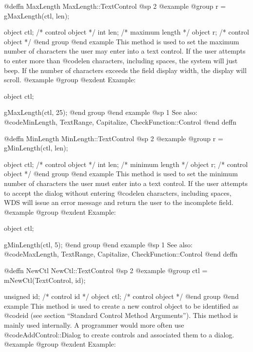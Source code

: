 @deffn {MaxLength} MaxLength::TextControl
@sp 2
@example
@group
r = gMaxLength(ctl, len);

object  ctl;   /*  control object  */
int     len;   /*  maximum length  */
object  r;     /*  control object  */
@end group
@end example
This method is used to set the maximum number of characters the user may
enter into a text control.  If the user attempts to enter more than
@code{len} characters, including spaces, the system will just beep.  If
the number of characters exceeds the field display width, the display
will scroll.
@example
@group
@exdent Example:

object  ctl;

gMaxLength(ctl, 25);
@end group
@end example
@sp 1
See also:  @code{MinLength, TextRange, Capitalize, CheckFunction::Control}
@end deffn












@deffn {MinLength} MinLength::TextControl
@sp 2
@example
@group
r = gMinLength(ctl, len);

object  ctl;   /*  control object  */
int     len;   /*  minimum length  */
object  r;     /*  control object  */
@end group
@end example
This method is used to set the minimum number of characters the user must
enter into a text control.  If the user attempts to accept the dialog
without entering @code{len} characters, including spaces, WDS will
issue an error message and return the user to the incomplete field.
@example
@group
@exdent Example:

object  ctl;

gMinLength(ctl, 5);
@end group
@end example
@sp 1
See also:  @code{MaxLength, TextRange, Capitalize, CheckFunction::Control}
@end deffn









@deffn {NewCtl} NewCtl::TextControl
@sp 2
@example
@group
ctl = mNewCtl(TextControl, id);

unsigned  id;   /*  control id      */
object   ctl;   /*  control object  */
@end group
@end example
This method is used to create a new control object to be identified as
@code{id} (see section ``Standard Control Method Arguments'').  This
method is mainly used internally.  A programmer would more often
use @code{AddControl::Dialog} to create controls and associated them
to a dialog.
@example
@group
@exdent Example:

